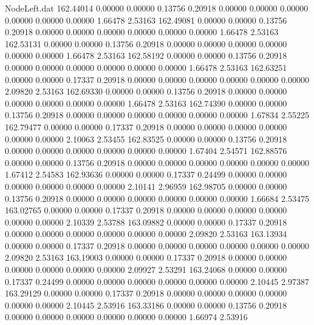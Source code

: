 \begin{filecontents}{NodeLeft.dat}
 162.44014    0.00000    0.00000     0.13756    0.20918    0.00000    0.00000    0.00000    0.00000    0.00000    0.00000    1.66478    2.53163
 162.49081    0.00000    0.00000     0.13756    0.20918    0.00000    0.00000    0.00000    0.00000    0.00000    0.00000    1.66478    2.53163
 162.53131    0.00000    0.00000     0.13756    0.20918    0.00000    0.00000    0.00000    0.00000    0.00000    0.00000    1.66478    2.53163
 162.58192    0.00000    0.00000     0.13756    0.20918    0.00000    0.00000    0.00000    0.00000    0.00000    0.00000    1.66478    2.53163
 162.63251    0.00000    0.00000     0.17337    0.20918    0.00000    0.00000    0.00000    0.00000    0.00000    0.00000    2.09820    2.53163
 162.69330    0.00000    0.00000     0.13756    0.20918    0.00000    0.00000    0.00000    0.00000    0.00000    0.00000    1.66478    2.53163
 162.74390    0.00000    0.00000     0.13756    0.20918    0.00000    0.00000    0.00000    0.00000    0.00000    0.00000    1.67834    2.55225
 162.79477    0.00000    0.00000     0.17337    0.20918    0.00000    0.00000    0.00000    0.00000    0.00000    0.00000    2.10063    2.53455
 162.83525    0.00000    0.00000     0.13756    0.20918    0.00000    0.00000    0.00000    0.00000    0.00000    0.00000    1.67404    2.54571
 162.88576    0.00000    0.00000     0.13756    0.20918    0.00000    0.00000    0.00000    0.00000    0.00000    0.00000    1.67412    2.54583
 162.93636    0.00000    0.00000     0.17337    0.24499    0.00000    0.00000    0.00000    0.00000    0.00000    0.00000    2.10141    2.96959
 162.98705    0.00000    0.00000     0.13756    0.20918    0.00000    0.00000    0.00000    0.00000    0.00000    0.00000    1.66684    2.53475
 163.02765    0.00000    0.00000     0.17337    0.20918    0.00000    0.00000    0.00000    0.00000    0.00000    0.00000    2.10339    2.53788
 163.09882    0.00000    0.00000     0.17337    0.20918    0.00000    0.00000    0.00000    0.00000    0.00000    0.00000    2.09820    2.53163
 163.13934    0.00000    0.00000     0.17337    0.20918    0.00000    0.00000    0.00000    0.00000    0.00000    0.00000    2.09820    2.53163
 163.19003    0.00000    0.00000     0.17337    0.20918    0.00000    0.00000    0.00000    0.00000    0.00000    0.00000    2.09927    2.53291
 163.24068    0.00000    0.00000     0.17337    0.24499    0.00000    0.00000    0.00000    0.00000    0.00000    0.00000    2.10445    2.97387
 163.29129    0.00000    0.00000     0.17337    0.20918    0.00000    0.00000    0.00000    0.00000    0.00000    0.00000    2.10445    2.53916
 163.33186    0.00000    0.00000     0.13756    0.20918    0.00000    0.00000    0.00000    0.00000    0.00000    0.00000    1.66974    2.53916

\end{filecontents}
